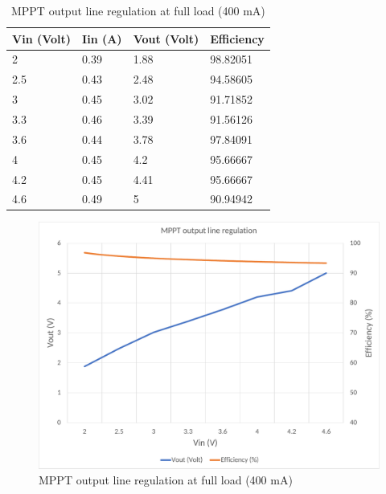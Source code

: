\begin{table}[H]
\centering
\begin{tabular}{|l|l|l|l|}
\hline
Vin (Volt) & Iin (A) & Vout (Volt) & Efficiency \\ \hline
2          & 0.39    & 1.88        & 98.82051   \\ \hline
2.5        & 0.43    & 2.48        & 94.58605   \\ \hline
3          & 0.45    & 3.02        & 91.71852   \\ \hline
3.3        & 0.46    & 3.39        & 91.56126   \\ \hline
3.6        & 0.44    & 3.78        & 97.84091   \\ \hline
4          & 0.45    & 4.2         & 95.66667   \\ \hline
4.2        & 0.45    & 4.41        & 95.66667   \\ \hline
4.6        & 0.49    & 5           & 90.94942   \\ \hline
\end{tabular}
\caption{MPPT output line regulation at full load (400 mA)}
\label{table:4}
\end{table}

\begin{figure}[h]
	\centering
	\includegraphics[width=\columnwidth]{IMGS/MPPT output line regulation at full load (400mA).pdf}
	\caption{MPPT output line regulation at full load (400 mA)}
	\label{fig:arch}
\end{figure}








